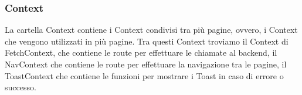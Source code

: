 \subsubsection{Context}
La cartella Context contiene i Context condivisi tra più pagine, ovvero, i Context che vengono utilizzati in più pagine. Tra questi Context troviamo il Context di FetchContext, che contiene le route per effettuare le chiamate al backend, il NavContext che contiene le route per effettuare la navigazione tra le pagine, il ToastContext che contiene le funzioni per mostrare i Toast in caso di errore o successo.\\
